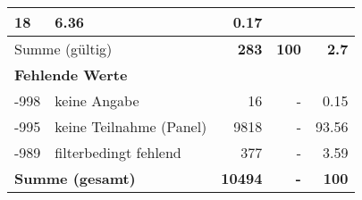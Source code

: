 \begin{longtable}{lXrrr}
       \num{18} &
       \num[round-mode=places,round-precision=2]{6,36} &
         \num[round-mode=places,round-precision=2]{0,17} \\
     \midrule
     \multicolumn{2}{l}{Summe (gültig)} &
       \textbf{\num{283}} &
     \textbf{100} &
       \textbf{\num[round-mode=places,round-precision=2]{2,7}} \\
     \multicolumn{5}{l}{\textbf{Fehlende Werte}}\\
       -998 &
       keine Angabe &
         \num{16} &
        - &
         \num[round-mode=places,round-precision=2]{0,15} \\
       -995 &
       keine Teilnahme (Panel) &
         \num{9818} &
        - &
         \num[round-mode=places,round-precision=2]{93,56} \\
       -989 &
       filterbedingt fehlend &
         \num{377} &
        - &
         \num[round-mode=places,round-precision=2]{3,59} \\
     \midrule
     \multicolumn{2}{l}{\textbf{Summe (gesamt)}} &
          \textbf{\num{10494}} &
        \textbf{-} &
        \textbf{100} \\
     \bottomrule
     \end{longtable}
     
